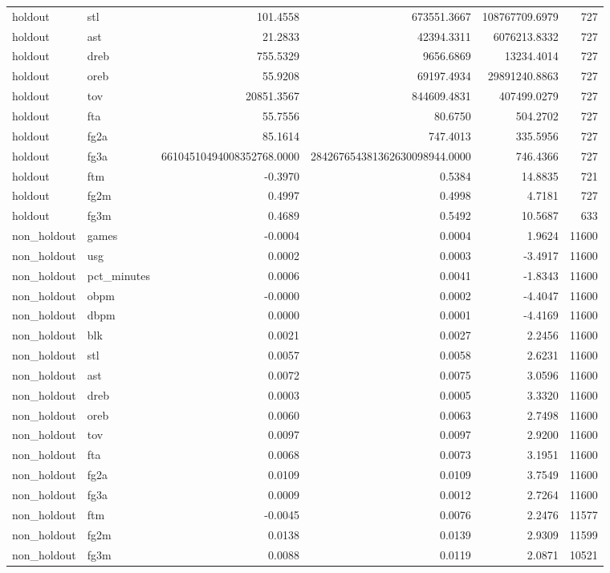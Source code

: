 \begin{table}
\begin{tabular}{llrrrr}
holdout & stl & 101.4558 & 673551.3667 & 108767709.6979 & 727 \\
holdout & ast & 21.2833 & 42394.3311 & 6076213.8332 & 727 \\
holdout & dreb & 755.5329 & 9656.6869 & 13234.4014 & 727 \\
holdout & oreb & 55.9208 & 69197.4934 & 29891240.8863 & 727 \\
holdout & tov & 20851.3567 & 844609.4831 & 407499.0279 & 727 \\
holdout & fta & 55.7556 & 80.6750 & 504.2702 & 727 \\
holdout & fg2a & 85.1614 & 747.4013 & 335.5956 & 727 \\
holdout & fg3a & 66104510494008352768.0000 & 284267654381362630098944.0000 & 746.4366 & 727 \\
holdout & ftm & -0.3970 & 0.5384 & 14.8835 & 721 \\
holdout & fg2m & 0.4997 & 0.4998 & 4.7181 & 727 \\
holdout & fg3m & 0.4689 & 0.5492 & 10.5687 & 633 \\
non\_holdout & games & -0.0004 & 0.0004 & 1.9624 & 11600 \\
non\_holdout & usg & 0.0002 & 0.0003 & -3.4917 & 11600 \\
non\_holdout & pct\_minutes & 0.0006 & 0.0041 & -1.8343 & 11600 \\
non\_holdout & obpm & -0.0000 & 0.0002 & -4.4047 & 11600 \\
non\_holdout & dbpm & 0.0000 & 0.0001 & -4.4169 & 11600 \\
non\_holdout & blk & 0.0021 & 0.0027 & 2.2456 & 11600 \\
non\_holdout & stl & 0.0057 & 0.0058 & 2.6231 & 11600 \\
non\_holdout & ast & 0.0072 & 0.0075 & 3.0596 & 11600 \\
non\_holdout & dreb & 0.0003 & 0.0005 & 3.3320 & 11600 \\
non\_holdout & oreb & 0.0060 & 0.0063 & 2.7498 & 11600 \\
non\_holdout & tov & 0.0097 & 0.0097 & 2.9200 & 11600 \\
non\_holdout & fta & 0.0068 & 0.0073 & 3.1951 & 11600 \\
non\_holdout & fg2a & 0.0109 & 0.0109 & 3.7549 & 11600 \\
non\_holdout & fg3a & 0.0009 & 0.0012 & 2.7264 & 11600 \\
non\_holdout & ftm & -0.0045 & 0.0076 & 2.2476 & 11577 \\
non\_holdout & fg2m & 0.0138 & 0.0139 & 2.9309 & 11599 \\
non\_holdout & fg3m & 0.0088 & 0.0119 & 2.0871 & 10521 \\
\bottomrule
\end{tabular}
\end{table}
